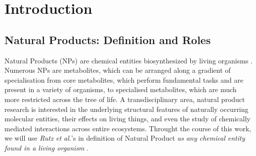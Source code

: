 \documentclass[
11pt, %
oneside, %
english, %
singlespacing, %
headsepline, %
chapterinoneline, %
]{MastersDoctoralThesis} %
\begin{document}



\mainmatter %

\pagestyle{thesis} %


%
% 
%
% 
% 
%

\chapter{Introduction}\label{chap:intro}

\section{Natural Products: Definition and Roles}\label{sec:NP def and roles}
Natural Products (NPs) are chemical entities biosynthesized by living organisms \cite{AllNatural2007}. Numerous NPs are metabolites, which can be arranged along a gradient of specialisation from core metabolites, which perform fundamental tasks and are present in a variety of organisms, to specialised metabolites, which are much more restricted across the tree of life. A transdisciplinary area, natural product research is interested in the underlying structural features of naturally occurring molecular entities, their effects on living things, and even the study of chemically mediated interactions across entire ecosystems. Throught the course of this work, we will use \textit{Rutz et al.}'s in definition of Natural Product \textit{as any chemical entity found in a living organism} \cite{rutzLOTUSInitiativeOpen2022}.
\end{document}
